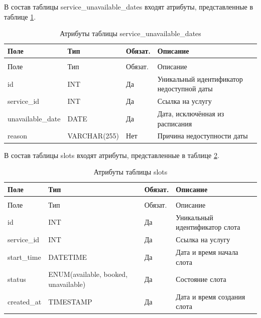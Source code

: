 В состав таблицы service\_unavailable\_dates входят атрибуты, представленные в таблице \ref{unavailabledates:table}.

\begin{longtable}{|>{\raggedright\arraybackslash}p{3.8cm}|>{\raggedright\arraybackslash}p{3.8cm}|>{\centering\arraybackslash}p{2.0cm}|>{\raggedright\arraybackslash}p{5.4cm}|}
	\caption{Атрибуты таблицы service\_unavailable\_dates}\label{unavailabledates:table} \\ \hline
	\centering Поле & \centering Тип & \centering Обязат. & \centering\arraybackslash Описание \\ \hline
	\endfirsthead
	\multicolumn{4}{l}{Продолжение таблицы \ref{unavailabledates:table}} \\ \hline
	\centering Поле & \centering Тип & \centering Обязат. & \centering\arraybackslash Описание \\ \hline
	\endhead
	id & INT & Да & Уникальный идентификатор недоступной даты \\ \hline
	service\_id & INT & Да & Ссылка на услугу \\ \hline
	unavailable\_date & DATE & Да & Дата, исключённая из расписания \\ \hline
	reason & VARCHAR(255) & Нет & Причина недоступности даты \\ \hline
\end{longtable}

В состав таблицы slots входят атрибуты, представленные в таблице \ref{slots:table}.

\begin{longtable}{|>{\raggedright\arraybackslash}p{3.8cm}|>{\raggedright\arraybackslash}p{3.8cm}|>{\centering\arraybackslash}p{2.0cm}|>{\raggedright\arraybackslash}p{5.4cm}|}
	\caption{Атрибуты таблицы slots}\label{slots:table} \\ \hline
	\centering Поле & \centering Тип & \centering Обязат. & \centering\arraybackslash Описание \\ \hline
	\endfirsthead
	\multicolumn{4}{l}{Продолжение таблицы \ref{slots:table}} \\ \hline
	\centering Поле & \centering Тип & \centering Обязат. & \centering\arraybackslash Описание \\ \hline
	\endhead
	id & INT & Да & Уникальный идентификатор слота \\ \hline
	service\_id & INT & Да & Ссылка на услугу \\ \hline
	start\_time & DATETIME & Да & Дата и время начала слота \\ \hline
	status & ENUM(available, booked, unavailable) & Да & Состояние слота \\ \hline
	created\_at & TIMESTAMP & Да & Дата и время создания слота \\ \hline
\end{longtable}

